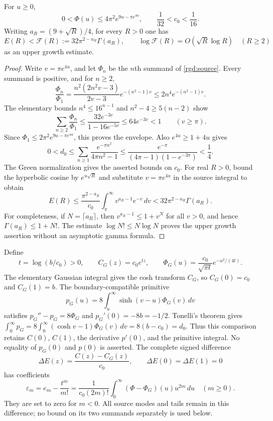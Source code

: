 \begin{lemma}
\label{rgd:envelope}
For $u\ge0$,
\begin{equation}
 0<\Phi(u)\le4\pi^2e^{9u-\pi e^{4u}},\qquad
 \frac1{32}<c_0<\frac1{16}.
 \label{rgd:envelope-equation}
\end{equation}
Writing $a_R=(9+\sqrt R)/4$, for every $R>0$ one has
\begin{equation}
 E(R)<\mathcal F(R):=32\pi^{2-a_R}\Gamma(a_R),
 \qquad \log\mathcal F(R)=O(\sqrt R\log R)\quad(R\ge2)
 \label{rgd:entire-growth}
\end{equation}
as an upper growth estimate.
\end{lemma}
\begin{proof}
Write $v=\pi e^{4u}$, and let $\Phi_n$ be the $n$th summand of
\eqref{rgd:source}.  Every summand is positive, and for $n\ge2$,
\[
 \frac{\Phi_n}{\Phi_1}
 =\frac{n^2(2n^2v-3)}{2v-3}e^{-(n^2-1)v}
 \le2n^4e^{-(n^2-1)v}.
\]
The elementary bounds $n^4\le16^{n-1}$ and
$n^2-4\ge5(n-2)$ show
\[
 \sum_{n\ge2}\frac{\Phi_n}{\Phi_1}
 \le\frac{32e^{-3v}}{1-16e^{-5v}}\le64e^{-3v}<1
       \qquad(v\ge\pi).
\]
Since $\Phi_1\le2\pi^2e^{9u-\pi e^{4u}}$, this proves the envelope.
Also $e^{4u}\ge1+4u$ gives
\[
 0<d_0\le\sum_{n\ge1}\frac{e^{-\pi n^2}}{4\pi n^2-1}
 \le\frac{e^{-\pi}}{(4\pi-1)(1-e^{-3\pi})}<\frac14.
\]
The Green normalization gives the asserted bounds on $c_0$.
For real $R>0$, bound the hyperbolic cosine by $e^{u\sqrt R}$ and
substitute $v=\pi e^{4u}$ in the source integral to obtain
\[
 E(R)\le\frac{\pi^{2-a_R}}{c_0}
       \int_\pi^\infty v^{a_R-1}e^{-v}\,dv
       <32\pi^{2-a_R}\Gamma(a_R).
\]
For completeness, if $N=\lceil a_R\rceil$, then
$v^{a_R-1}\le1+v^N$ for all $v>0$, and hence
$\Gamma(a_R)\le1+N!$.  The estimate $\log N!\le N\log N$ proves
the upper growth assertion without an asymptotic gamma formula.
\end{proof}

Define
\begin{equation}
 t=\log(b/c_0)>0,\qquad C_G(z)=c_0e^{tz},\qquad
 \Phi_G(u)=\frac{c_0}{\sqrt{\pi t}}e^{-u^2/(4t)}.
 \label{rgd:gaussian}
\end{equation}
The elementary Gaussian integral gives the cosh transform $C_G$,
so $C_G(0)=c_0$ and $C_G(1)=b$.  The boundary-compatible primitive
\[
 p_G(u)=8\int_u^\infty\sinh(v-u)\Phi_G(v)\,dv
\]
satisfies $p_G''-p_G=8\Phi_G$ and $p_G'(0)=-8b=-1/2$.
Tonelli's theorem gives
$\int_0^\infty p_G=8\int_0^\infty(\cosh v-1)\Phi_G(v)\,dv
=8(b-c_0)=d_0$.  Thus this comparison retains $C(0)$, $C(1)$, the derivative
$p'(0)$, and the primitive integral.  No equality of $p_G(0)$
and $p(0)$ is asserted.
The complete signed difference
\[
 \Delta E(z)=\frac{C(z)-C_G(z)}{c_0},\qquad
 \Delta E(0)=\Delta E(1)=0
\]
has coefficients
\begin{equation}
 \varepsilon_m=e_m-\frac{t^m}{m!}
 =\frac1{c_0(2m)!}\int_0^\infty
       (\Phi-\Phi_G)(u)u^{2m}\,du\quad(m\ge0).
 \label{rgd:complete-difference}
\end{equation}
They are set to zero for $m<0$.  All source modes and tails remain in
this difference; no bound on its two summands separately is used below.

